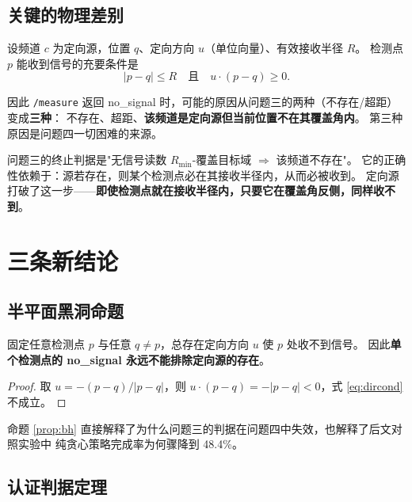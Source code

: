 \subsection{关键的物理差别}

设频道 $c$ 为定向源，位置 $q$、定向方向 $u$（单位向量）、有效接收半径 $R$。
检测点 $p$ 能收到信号的充要条件是
\begin{equation}
|p-q|\le R\quad\text{且}\quad u\cdot(p-q)\ge0 .
\label{eq:dircond}
\end{equation}

因此 \texttt{/measure} 返回 no\_signal 时，可能的原因从问题三的两种（不存在/超距）变成\textbf{三种}：
不存在、超距、\textbf{该频道是定向源但当前位置不在其覆盖角内}。
第三种原因是问题四一切困难的来源。

\begin{keybox}[title=核心矛盾]
问题三的终止判据是"无信号读数 $R_{\min}$-覆盖目标域 $\Rightarrow$ 该频道不存在"。
它的正确性依赖于：源若存在，则某个检测点必在其接收半径内，从而必被收到。
定向源打破了这一步——\textbf{即使检测点就在接收半径内，只要它在覆盖角反侧，同样收不到}。
\end{keybox}

\section{三条新结论}

\subsection{半平面黑洞命题}

\begin{proposition}[半平面黑洞]\label{prop:bh}
固定任意检测点 $p$ 与任意 $q\ne p$，总存在定向方向 $u$ 使 $p$ 处收不到信号。
因此\textbf{单个检测点的 no\_signal 永远不能排除定向源的存在}。
\end{proposition}
\begin{proof}
取 $u=-(p-q)/|p-q|$，则 $u\cdot(p-q)=-|p-q|<0$，式 \eqref{eq:dircond} 不成立。
\end{proof}

命题 \ref{prop:bh} 直接解释了为什么问题三的判据在问题四中失效，也解释了后文对照实验中
纯贪心策略完成率为何骤降到 48.4\%。

\subsection{认证判据定理}


